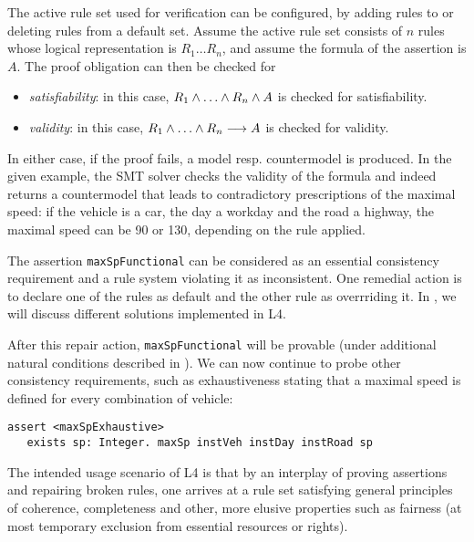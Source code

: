 The active rule set used for verification can be configured, by adding rules
to or deleting rules from a default set. Assume the active rule set consists
of $n$ rules whose logical representation is $R_1 \dots R_n$, and assume the
formula of the assertion is $A$. The proof obligation can then be checked for
\begin{itemize}
\item  \emph{satisfiability}: in this case, $R_1 \AND \dots \AND R_n \AND A$
  is checked for satisfiability.
\item \emph{validity}: in this case, $R_1 \AND \dots \AND R_n \IMPL A$ is
  checked for validity.
\end{itemize}
In either case, if the proof fails, a model resp.{} countermodel is produced.
In the given example, the SMT solver checks the validity of the formula and
indeed returns a countermodel that leads to contradictory prescriptions of the
maximal speed: if the vehicle is a car, the day a workday and the road a
highway, the maximal speed can be 90 or 130, depending on the rule applied.

The assertion \texttt{maxSpFunctional} can be considered as an essential
consistency requirement and a rule system violating it as inconsistent. One
remedial action is to declare one of the rules as default and the other rule
as overrriding it. In , we will discuss different solutions
implemented in L4.

After this repair action, \texttt{maxSpFunctional} will be provable (under
additional natural conditions described in ). We can now
continue to probe other consistency requirements, such as exhaustiveness
stating that a maximal speed is defined for every combination of vehicle:

\begin{lstlisting}
assert <maxSpExhaustive>
   exists sp: Integer. maxSp instVeh instDay instRoad sp
\end{lstlisting}

The intended usage scenario of L4 is that by an interplay of proving
assertions and repairing broken rules, one arrives at a rule set satisfying
general principles of coherence, completeness and other, more elusive
properties such as fairness (at most temporary exclusion from essential
resources or rights).


